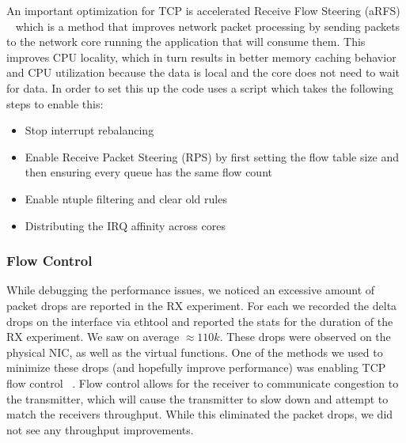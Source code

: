 An important optimization for TCP is accelerated Receive Flow Steering (aRFS) ~\cite{arfs} which is a method that improves network packet processing by sending packets to the network core running the application that will consume them. This improves CPU locality, which in turn results in better memory caching behavior and CPU utilization because the data is local and the core does not need to wait for data. In order to set this up the code uses a script which takes the following steps to enable this: \begin{itemize}
    \item Stop interrupt rebalancing
    \item Enable Receive Packet Steering (RPS) by first setting the flow table size and then ensuring every queue has the same flow count
    \item Enable ntuple filtering and clear old rules
    \item Distributing the IRQ affinity across cores
\end{itemize}

\subsubsection{Flow Control}
\label{subsubsec:flowctrl}

While debugging the performance issues, we noticed an excessive amount of packet drops are reported in the RX experiment. For each we recorded the delta drops on the interface via ethtool and reported the stats for the duration of the RX experiment. We saw on average $\approx 110k$. These drops were observed on the physical NIC, as well as the virtual functions. One of the methods we used to minimize these drops (and hopefully improve performance) was enabling TCP flow control ~\cite{flowctrl}. Flow control allows for the receiver to communicate congestion to the transmitter, which will cause the transmitter to slow down and attempt to match the receivers throughput. While this eliminated the packet drops, we did not see any throughput improvements. 